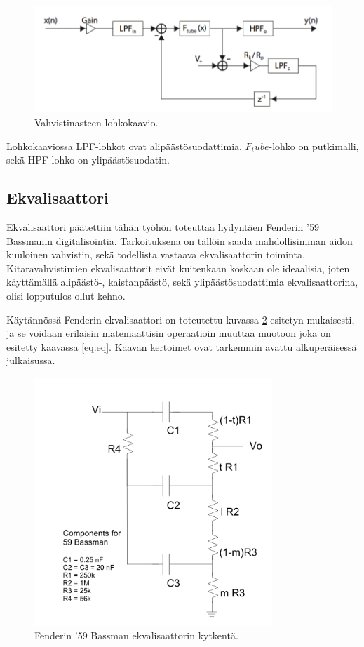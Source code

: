 \documentclass[11pt, a4paper, oneside]{article}
\begin{document}
\begin{figure}[h!]
\includegraphics[width=1\textwidth, center]{drive.png} \newline
\caption{Vahvistinasteen lohkokaavio.}
\label{fig:drive}
\end{figure}

Lohkokaaviossa LPF-lohkot ovat alipäästösuodattimia, $F_tube$-lohko on putkimalli, sekä HPF-lohko on ylipäästösuodatin. 
 
 \subsection{Ekvalisaattori}

Ekvalisaattori päätettiin tähän työhön toteuttaa hydyntäen Fenderin '59 Bassmanin digitalisointia. 
Tarkoituksena on tällöin saada mahdollisimman aidon kuuloinen vahvistin, sekä todellista vastaava ekvalisaattorin toiminta. 
Kitaravahvistimien ekvalisaattorit eivät kuitenkaan koskaan ole ideaalisia, joten käyttämällä alipäästö-, kaistanpäästö, sekä ylipäästösuodattimia ekvalisaattorina, olisi lopputulos ollut kehno. \cite{fender}

Käytännössä Fenderin ekvalisaattori on toteutettu kuvassa \ref{fig:eq} esitetyn mukaisesti, ja se voidaan erilaisin matemaattisin operaatioin muuttaa muotoon joka on esitetty kaavassa \ref{eq:eq}. 
Kaavan kertoimet ovat tarkemmin avattu alkuperäisessä julkaisussa. \cite{fender}

\begin{figure}[h!]
\includegraphics[width=0.8\textwidth, center]{eq.png} \newline
\caption{Fenderin '59 Bassman ekvalisaattorin kytkentä. \cite{fender}}
\label{fig:eq}
\end{figure}
\end{document}

